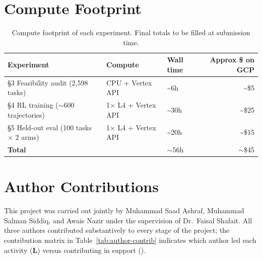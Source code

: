 \documentclass[12pt,a4paper]{report}
\begin{document}
\chapter{Compute Footprint}

\begin{table}[h]
\centering
\small
\begin{tabular}{lllr}
\toprule
\textbf{Experiment} & \textbf{Compute} & \textbf{Wall time} & \textbf{Approx \$ on GCP} \\
\midrule
\S 3 Feasibility audit (2{,}598 tasks) & CPU + Vertex API & \textasciitilde 6h & \textasciitilde \$5 \\
\S 4 RL training ($\sim$600 trajectories) & 1$\times$ L4 + Vertex API & \textasciitilde 30h & \textasciitilde \$25 \\
\S 5 Held-out eval (100 tasks $\times$ 2 arms) & 1$\times$ L4 + Vertex API & \textasciitilde 20h & \textasciitilde \$15 \\
\midrule
\textbf{Total} & & $\sim$56h & $\sim$\$45 \\
\bottomrule
\end{tabular}
\caption{Compute footprint of each experiment. Final totals to be filled at submission time.}
\label{tab:compute}
\end{table}

\chapter{Author Contributions}

This project was carried out jointly by Muhammad Saad Ashraf, Muhammad Salman Siddiq, and Awais Nazir under the supervision of Dr.~Faisal Shafait. All three authors contributed substantively to every stage of the project; the contribution matrix in Table~\ref{tab:author-contrib} indicates which author led each activity (\textbf{L}) versus contributing in support (\checkmark).
\end{document}
